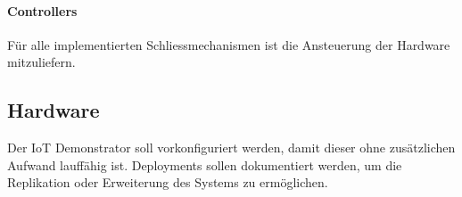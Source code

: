 \paragraph{Controllers}
Für alle implementierten Schliessmechanismen ist die Ansteuerung der Hardware mitzuliefern.

\subsection{Hardware}
Der IoT Demonstrator soll vorkonfiguriert werden, damit dieser ohne zusätzlichen Aufwand lauffähig ist. Deployments sollen dokumentiert werden, um die Replikation oder Erweiterung des Systems zu ermöglichen.
